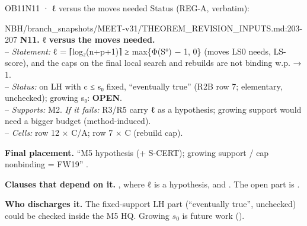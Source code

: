 \begin{card}{OB11}{N11 · ℓ versus the moves needed}
Status (REG-A, verbatim):  
\begin{stmt}{NBH/branch_snapshots/MEET-v31/THEOREM_REVISION_INPUTS.md:203-207}
\textbf{N11. ℓ versus the moves needed.}\\
– \emph{Statement:} ℓ = ⌈log₂(n+p+1)⌉ ≥ max\{Φ(S°) − 1, 0\} (moves LS0 needs, LS-score), and the caps on the final local search and rebuilds are not binding w.p. → 1.\\
– \emph{Status:} on LH with c ≤ s₀ fixed, ``eventually true'' (R2B row 7; elementary, unchecked); growing s₀: \textbf{OPEN}.\\
– \emph{Supports:} M2. \emph{If it fails:} R3/R5 carry ℓ as a hypothesis; growing support would need a bigger budget (method-induced).\\
– \emph{Cells:} row 12 × C/A; row 7 × C (rebuild cap).
\end{stmt}
\textbf{Final placement.} ``M5 hypothesis (+ S-CERT); growing support / cap nonbinding = FW19'' .

\textbf{Clauses that depend on it.} , where ℓ is a hypothesis, and . The open part is .

\textbf{Who discharges it.} The fixed-support LH part (``eventually true'', unchecked) could be checked inside the M5 HQ. Growing $s_0$ is future work ().
\end{card}

